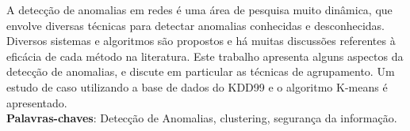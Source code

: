 \par
\begin{resumo}
\indent A detecção de anomalias em redes é uma área de pesquisa muito dinâmica, que envolve diversas técnicas para detectar anomalias conhecidas e desconhecidas. Diversos sistemas e algoritmos são propostos e há muitas discussões referentes à eficácia de cada método na literatura. Este trabalho apresenta alguns aspectos da detecção de anomalias, e discute em particular as técnicas de agrupamento. Um estudo de caso utilizando a base de dados do KDD99 e o algoritmo K-means é apresentado.
\vspace{\onelineskip} \\
\noindent
\textbf{Palavras-chaves}: Detecção de Anomalias, clustering, segurança da informação.
\end{resumo}
